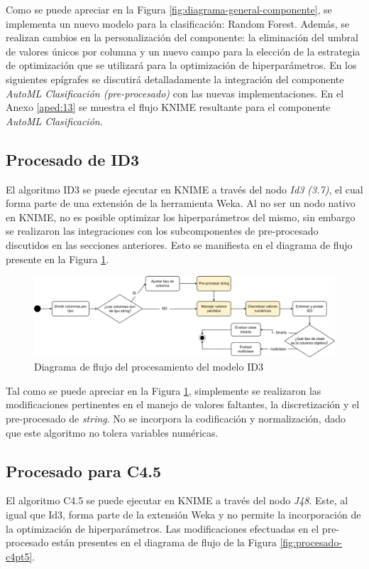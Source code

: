 Como se puede apreciar en la Figura \ref{fig:diagrama-general-componente}, se implementa un nuevo modelo para la clasificación: Random Forest. Además, se realizan cambios en la personalización del componente: la eliminación del umbral de valores únicos por columna y un nuevo campo para la elección de la estrategia de optimización que se utilizará para la optimización de hiperparámetros. En los siguientes epígrafes se discutirá detalladamente la integración del componente \textit{AutoML Clasificación (pre-procesado)} con las nuevas implementaciones. En el Anexo \ref{aped:13} se muestra el flujo KNIME resultante para el componente \textit{AutoML Clasificación}.

\subsection{Procesado de ID3}
El algoritmo ID3 se puede ejecutar en KNIME a través del nodo \textit{Id3 (3.7)}, el cual forma parte de una extensión de la herramienta Weka. Al no ser un nodo nativo en KNIME, no es posible optimizar los hiperparámetros del mismo, sin embargo se realizaron las integraciones con los subcomponentes de pre-procesado discutidos en las secciones anteriores. Esto se manifiesta en el diagrama de flujo presente en la Figura \ref{fig:procesado-id3}.

\begin{figure}[H]
	\centering
	\includegraphics[width=0.9\linewidth]{"figuras/capi 2/modelos/procesado id3.drawio"}
	\caption{Diagrama de flujo del procesamiento del modelo ID3}
	\label{fig:procesado-id3}
\end{figure}

Tal como se puede apreciar en la Figura \ref{fig:procesado-id3}, simplemente se realizaron las modificaciones pertinentes en el manejo de valores faltantes, la discretización y el pre-procesado de \textit{string}. No se incorpora la codificación y normalización, dado que este algoritmo no tolera variables numéricas.

\subsection{Procesado para C4.5}
El algoritmo C4.5 se puede ejecutar en KNIME a través del nodo \textit{J48}. Este, al igual que Id3, forma parte de la extensión Weka y no permite la incorporación de la optimización de hiperparámetros. Las modificaciones efectuadas en el pre-procesado están presentes en el diagrama de flujo de la Figura \ref{fig:procesado-c4pt5}.


